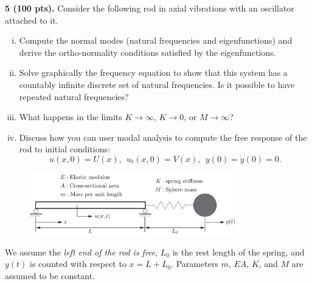 \begin{problem}
\textbf{5 (100 pts).} Consider the following rod in axial vibrations with an oscillator attached to it. 
\begin{enumerate}[(i)]
    \item Compute the normal modes (natural frequencies and eigenfunctions) and derive the ortho-normality conditions satisfied by the eigenfunctions.
    \item Solve graphically the frequency equation to show that this system has a countably infinite discrete set of natural frequencies. 
    Is it possible to have repeated natural frequencies?
    \item What happens in the limits $K\rightarrow \infty$, $K\rightarrow 0$, or $M\rightarrow \infty$?
    \item Discuss how you can user modal analysis to compute the free response of the rod to initial conditions:
    \begin{equation}
        u(x, 0) = U(x), ~~ u_t(x, 0) = V(x), ~~ y(0) = \dot{y}(0) = 0.
    \end{equation}
\end{enumerate}
\end{problem}

\begin{figure}[!ht]
    \centering
    \includegraphics[width=0.8\textwidth]{homework/hw2/assets/hw2_p5.pdf}
\end{figure}


We assume the \emph{left end of the rod is free}, $L_0$ is the rest length of the spring, and $y(t)$ is counted with respect to $x = L + L_0$. 
Parameters $m$, $EA$, $K$, and $M$ are assumed to be constant. 

